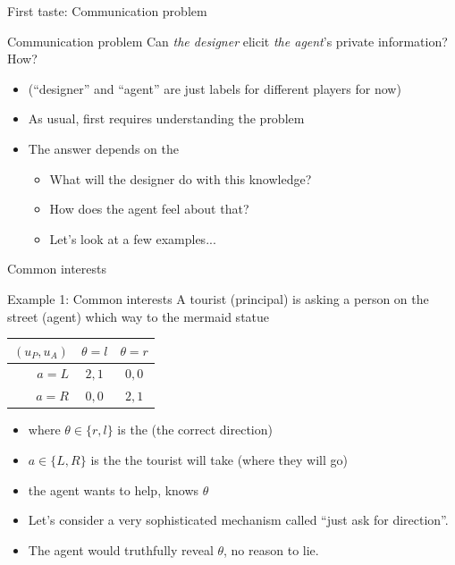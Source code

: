 \documentclass[english,10pt
,aspectratio=169
]{beamer}
\begin{document}
\begin{frame}{First taste: Communication problem}
	\begin{block}{Communication problem}
		Can \emph{the designer} elicit \emph{the agent}'s \alert{private information}? How?
	\end{block}
	\begin{itemize}
		\item (``designer'' and ``agent'' are just labels for different players for now)
		\pause 
		\item As usual,  first requires \alert{understanding the problem}
		\pause
		\item The answer depends on the 
		\begin{itemize}
			\item What will the designer do with this knowledge?
			\item How does the agent feel about that?
			\item Let's look at a few examples...
		\end{itemize}
	\end{itemize}
\end{frame}


\begin{frame}{Common interests}
	\begin{exampleblock}{Example 1: Common interests}
		A tourist (principal) is asking a person on the street (agent) which way to the mermaid statue
		\begin{center}
			\begin{tabular}{r | c | c |}
				$(u_P,u_A)$	& $\theta=l$	& $\theta=r$
				\\ \hline 
				$a=L$ 		& $2,1$			& $0,0$
				\\ \hline
				$a=R$		& $0,0$			& $2,1$
				\\ \hline 
			\end{tabular}
		\end{center}
	\end{exampleblock}
	 
	\begin{itemize}
		\item where $\theta\in \{r,l\}$ is the  (the correct direction)
		\item $a \in \{L,R\}$ is the  the tourist will take (where they will go)
		\item the agent wants to help, knows $\theta$
		\pause \bigskip 
		\item Let's consider a very sophisticated \alert<2>{mechanism} called ``just ask for direction''.
		\pause
		\item The agent would truthfully reveal $\theta$, no reason to lie.
	\end{itemize}
\end{frame}
\end{document}
